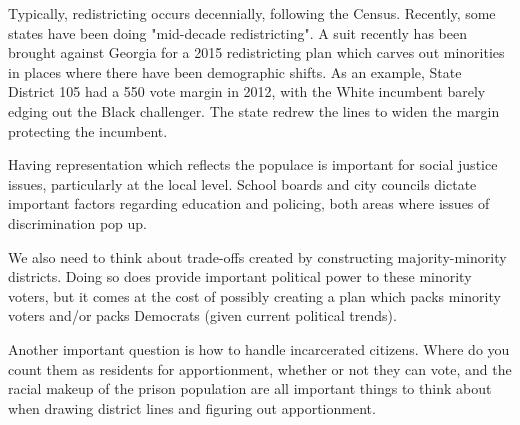 Typically, redistricting occurs decennially, following the Census.  Recently, some states have been doing "mid-decade redistricting".  A suit recently has been brought against Georgia for a 2015 redistricting plan which carves out minorities in places where there have been demographic shifts.  As an example, State District 105 had a 550 vote margin in 2012, with the White incumbent barely edging out the Black challenger.  The state redrew the lines to widen the margin protecting the incumbent.  

Having representation which reflects the populace is important for social justice issues, particularly at the local level.  School boards and city councils dictate important factors regarding education and policing, both areas where issues of discrimination pop up.

We also need to think about trade-offs created by constructing majority-minority districts.  Doing so does provide important political power to these minority voters, but it comes at the cost of possibly creating a plan which packs minority voters and/or packs Democrats (given current political trends).

Another important question is how to handle incarcerated citizens.  Where do you count them as residents for apportionment, whether or not they can vote, and the racial makeup of the prison population are all important things to think about when drawing district lines and figuring out apportionment.